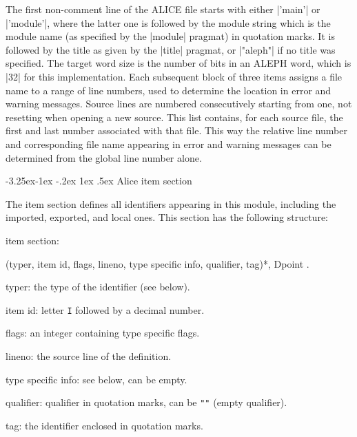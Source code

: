 \documentclass[titlepage]{article}
\makeatletter
\newcommand\A{\textsf{ALEPH}}
\newcommand\I{\textsf{ALICE}}
\newenvironment{grammar}{%
\begin{list}{}{%
\setlength\leftmargin{18pt}%
\setlength\rightmargin{-5pt}%
\setlength\listparindent{20pt}%
\setlength\itemsep{1pt plus0.2ex}%
\setlength\parsep{0pt plus 2pt}%
\setlength\labelsep{-5pt}%
}\color{blue!90!black}\sf\mkoptions%
}{\end{list}}
\newcommand\g[1]{\textsf{\color{blue!90!black}#1}}
\def\remark#1{{\normalfont #1}}
\renewcommand\subsection{%
\@startsection{subsection}{2}{\z@}%
   {-3.25ex\@plus -1ex \@minus -.2ex}%
   {1ex \@plus .5ex}%
   {\normalfont\normalsize\bfseries}}
\makeatother
\begin{document}
\noindent
The first non-comment line of the \I{} file starts with either \pp|'main'|
or \pp|'module'|, where the latter one is followed by the \g{module string}
which is the module name (as specified by the \pp|module| pragmat) in
quotation marks. It is followed by the title as given by the \pp|title|
pragmat, or \pp|"aleph"| if no title was specified. The target word size is the
number of bits in an \A{} word, which is \pp|32| for this implementation. Each
subsequent block of three items assigns a file name to a range of line
numbers, used to determine the
location in error and warning messages. Source lines are numbered consecutively
starting from one, not resetting when opening a new source. This list
contains, for each source file, the first and last number associated with
that file. This way the 
relative line number and corresponding file name appearing in error and
warning messages can be determined from the global line number alone.

\subsection{Alice item section}\label{alice:item}

The \g{item section} defines all identifiers appearing in this module,
including the imported, exported, and local ones. This section has the
following structure:
\begin{grammar}
\item item section: 

  (typer, item id, flags, lineno, type specific info, qualifier, tag)*, Dpoint .
\item typer: \remark{the type of the identifier (see below)}.
\item item id: \remark{letter {\tt I} followed by a decimal number}.
\item flags: \remark{an integer containing type specific flags}.
\item lineno: \remark{the source line of the definition}.
\item type specific info: \remark{see below, can be empty}.
\item qualifier: \remark{qualifier in quotation marks, can be {\tt""} (empty
qualifier)}.
\item tag: \remark{the identifier enclosed in quotation marks}.
\end{grammar}
\end{document}
